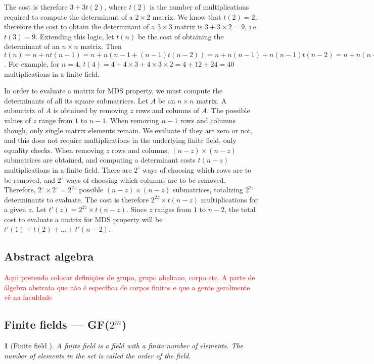 \documentclass{report}
\newtheorem*{concept}{}{\bfseries}{\itshape}
\begin{document}
The cost is therefore $3 + 3t(2)$, where $t(2)$ is the number of multiplications required to compute the determinant of a $2\times2$ matrix. We know that $t(2) = 2$, therefore the cost to obtain the determinant of a $3\times3$ matrix is $3+3\times2 = 9$, i.e $t(3) = 9$. Extending this logic, let $t(n)$ be the cost of obtaining the determinant of an $n\times n$ matrix. Then $t(n) = n + nt(n-1) = n + n(n-1 + (n-1) t(n-2)) = n + n(n-1) + n(n-1)t(n-2) = n + n(n-1) + n(n-1)(n-2) + ... + n(n-1)(n-2)..2$. For example, for $n = 4$, $t(4) = 4 + 4\times3 + 4\times3\times2 = 4 + 12 + 24 = 40$ multiplications in a finite field.

In order to evaluate a matrix for MDS property, we must compute the determinants of all its square submatrices. Let $A$ be an $n \times n$ matrix. A submatrix of $A$ is obtained by removing $z$ rows and columns of $A$. The possible values of $z$ range from $1$ to $n - 1$. When removing $n-1$ rows and columns though, only single matrix elements remain. We evaluate if they are zero or not, and this does not require multiplications in the underlying finite field, only equality checks. When removing $z$ rows and columns, $(n - z) \times (n - z)$ submatrices are obtained, and computing a determinant costs $t(n-z)$ multiplications in a finite field. There are $2^z$ ways of choosing which rows are to be removed, and $2^z$ ways of choosing which columns are to be removed. Therefore, $2^z \times 2^z = 2^{2z}$ possible $(n - z) \times (n - z)$ submatrices, totalizing $2^{2z}$ determinants to evaluate. The cost is therefore $2^{2z}\times t(n-z)$ multiplications for a given $z$. Let $t'(z) = 2^{2z} \times t(n-z)$. Since $z$ ranges from $1$ to $n-2$, the total cost to evaluate a matrix for MDS property will be $t'(1) + t(2) + ... + t'(n-2)$.

\subsection{Abstract algebra}
\textcolor{red}{Aqui pretendo colocar definições de grupo, grupo abeliano, corpo etc. A parte de álgebra abstrata que não é específica de corpos finitos e que a gente geralmente vê na faculdade}

\subsection{Finite fields --- GF($2^m$)}

\begin{concept}[Finite field \cite{DesignOfRijndael2002}]
A \emph{finite field} is a field with a finite number of elements. The number of elements in the set is called the \emph{order} of the field.
\end{concept}
\end{document}
